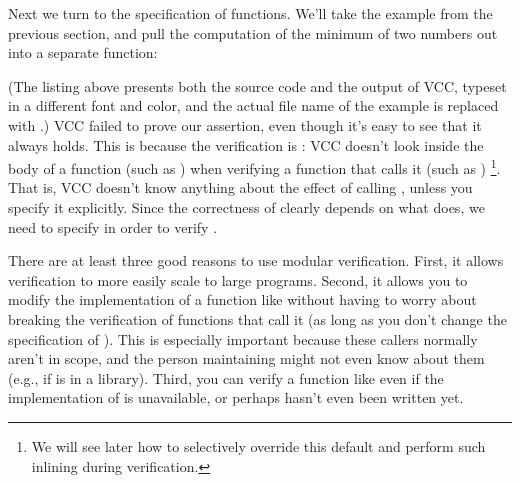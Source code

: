 Next we turn to the specification of functions. We'll take the example
from the previous section, and pull the computation of the minimum of
two numbers out into a separate function:


(The listing above presents both the source code and the output
of VCC, typeset in a different font and color, and 
the actual file name of the example is replaced with .)
VCC failed to prove our assertion, even though it's easy to see that
it always holds. This is because the verification is : VCC
doesn't look inside the body of a function (such as ) 
when verifying a function that calls it (such as )%
\footnote{We will see later how to selectively override this default
  and perform such inlining during verification.}.  
That is, VCC doesn't know anything about the effect of calling 
, unless you specify it explicitly.
Since the correctness of  clearly depends on what 
does, we need to specify  in order to verify .

\begin{note}
There are at least three good reasons to use modular
verification. First, it allows verification to more easily scale to
large programs. Second, it allows you to modify the implementation of
a function like  without having to worry about breaking the
verification of functions that call it (as long as you don't change
the specification of ). This is especially important
because these callers normally aren't in scope, and the person
maintaining  might not even know about them (e.g., if
 is in a library). Third, you can verify a function like
 even if the implementation of  is unavailable, or
perhaps hasn't even been written yet. 
\end{note}

